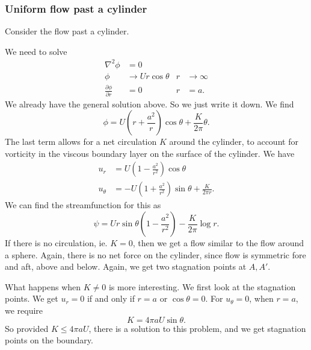 \documentclass[a4paper]{article}
\begin{document}
\subsubsection{Uniform flow past a cylinder}
Consider the flow past a cylinder.
\begin{center}
\end{center}
We need to solve
\begin{align*}
  \nabla^2 \phi &= 0\\
  \phi &\to U r\cos \theta & r & \to \infty\\
  \frac{\partial \phi}{\partial r} &= 0 & r &= a.
\end{align*}
We already have the general solution above. So we just write it down. We find
\[
  \phi = U\left(r + \frac{a^2}{r}\right) \cos \theta + \frac{K}{2\pi}\theta.
\]
The last term allows for a net circulation $K$ around the cylinder, to account for vorticity in the viscous boundary layer on the surface of the cylinder. We have
\begin{align*}
  u_r &= U\left(1 - \frac{a^2}{r^2}\right) \cos \theta\\
  u_\theta &= -U \left(1 + \frac{a^2}{r^2}\right) \sin \theta + \frac{K}{2 \pi r}.
\end{align*}
We can find the streamfunction for this as
\[
  \psi = Ur\sin \theta\left(1 - \frac{a^2}{r^2}\right) - \frac{K}{2\pi} \log r.
\]
If there is no circulation, ie. $K = 0$, then we get a flow similar to the flow around a sphere. Again, there is no net force on the cylinder, since flow is symmetric fore and aft, above and below. Again, we get two stagnation points at $A, A'$.


What happens when $K \not= 0$ is more interesting. We first look at the stagnation points. We get $u_r = 0$ if and only if $r = a$ or $\cos \theta = 0$. For $u_\theta = 0$, when $r = a$, we require
\[
  K = 4 \pi a U \sin \theta.
\]
So provided $K \leq 4 \pi a U$, there is a solution to this problem, and we get stagnation points on the boundary.
\end{document}
